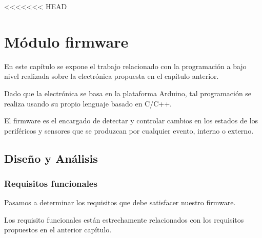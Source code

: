 <<<<<<< HEAD
\chapter{Módulo firmware}

En este capítulo se expone el trabajo relacionado con la programación a bajo nivel realizada sobre la electrónica propuesta en el capítulo anterior.

Dado que la electrónica se basa en la plataforma Arduino, tal programación se realiza usando su propio lenguaje basado en C/C++.

El firmware es el encargado de detectar y controlar cambios en los estados de los periféricos y sensores que se produzcan por cualquier evento, interno o externo.


\section{Diseño y Análisis}
\subsection{Requisitos funcionales}

Pasamos a determinar los requisitos que debe satisfacer nuestro firmware.


Los requisito funcionales están estrechamente relacionados con los requisitos propuestos en el anterior capítulo. 

